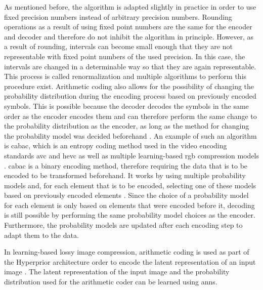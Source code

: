 As mentioned before, the algorithm is adapted slightly in practice in order to use fixed precision numbers instead of arbitrary precision numbers. Rounding operations as a result of using fixed point numbers are the same for the encoder and decoder and therefore do not inhibit the algorithm in principle. However, as a result of rounding, intervals can become small enough that they are not representable with fixed point numbers of the used precision. In this case, the intervals are changed in a determinable way so that they are again representable. This process is called renormalization and multiple algorithms to perform this procedure exist.
Arithmetic coding also allows for the possibility of changing the probability distribution during the encoding process based on previously encoded symbols. This is possible because the decoder decodes the symbols in the same order as the encoder encodes them and can therefore perform the same change to the probability distribution as the encoder, as long as the method for changing the probability model was decided beforehand \citep{said_introduction_2023}. An example of such an algorithm is \ac{cabac}, which is an entropy coding method used in the video encoding standards \ac{avc} and \ac{hevc} as well as multiple learning-based \ac{rgb} compression models \citep{balle_end--end_2017,balle_variational_2018,minnen_joint_2018}. \Ac{cabac} is a binary encoding method, therefore requiring the data that is to be encoded to be transformed beforehand. It works by using multiple probability models and, for each element that is to be encoded, selecting one of these models based on previously encoded elements \citep{sze_high_2012}. Since the choice of a probability model for each element is only based on elements that were encoded before it, decoding is still possible by performing the same probability model choices as the encoder. Furthermore, the probability models are updated after each encoding step to adapt them to the data.

In learning-based lossy image compression, arithmetic coding is used as part of the Hyperprior architecture order to encode the latent representation of an input image \citep{balle_end--end_2017,minnen_joint_2018,balle_variational_2018}. The latent representation of the input image and the probability distribution used for the arithmetic coder can be learned using \acp{ann}.

